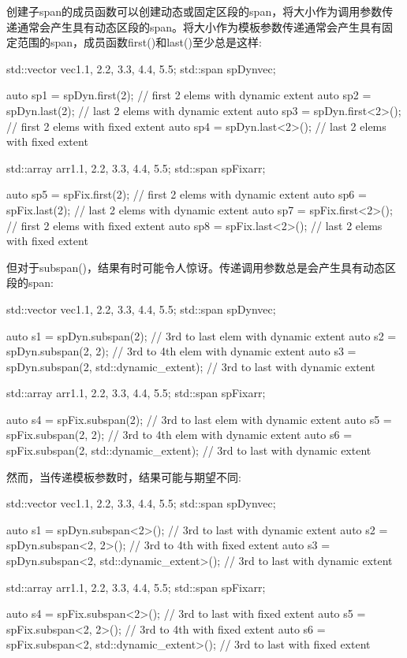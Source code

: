 
创建子span的成员函数可以创建动态或固定区段的span，将大小作为调用参数传递通常会产生具有动态区段的span。将大小作为模板参数传递通常会产生具有固定范围的span，成员函数first()和last()至少总是这样:

\begin{cpp}
std::vector vec{1.1, 2.2, 3.3, 4.4, 5.5};
std::span spDyn{vec};

auto sp1 = spDyn.first(2); // first 2 elems with dynamic extent
auto sp2 = spDyn.last(2); // last 2 elems with dynamic extent
auto sp3 = spDyn.first<2>(); // first 2 elems with fixed extent
auto sp4 = spDyn.last<2>(); // last 2 elems with fixed extent

std::array arr{1.1, 2.2, 3.3, 4.4, 5.5};
std::span spFix{arr};

auto sp5 = spFix.first(2); // first 2 elems with dynamic extent
auto sp6 = spFix.last(2); // last 2 elems with dynamic extent
auto sp7 = spFix.first<2>(); // first 2 elems with fixed extent
auto sp8 = spFix.last<2>(); // last 2 elems with fixed extent
\end{cpp}

但对于subspan()，结果有时可能令人惊讶。传递调用参数总是会产生具有动态区段的span:

\begin{cpp}
std::vector vec{1.1, 2.2, 3.3, 4.4, 5.5};
std::span spDyn{vec};

auto s1 = spDyn.subspan(2); // 3rd to last elem with dynamic extent
auto s2 = spDyn.subspan(2, 2); // 3rd to 4th elem with dynamic extent
auto s3 = spDyn.subspan(2, std::dynamic_extent); // 3rd to last with dynamic extent

std::array arr{1.1, 2.2, 3.3, 4.4, 5.5};
std::span spFix{arr};

auto s4 = spFix.subspan(2); // 3rd to last elem with dynamic extent
auto s5 = spFix.subspan(2, 2); // 3rd to 4th elem with dynamic extent
auto s6 = spFix.subspan(2, std::dynamic_extent); // 3rd to last with dynamic extent
\end{cpp}

然而，当传递模板参数时，结果可能与期望不同:

\begin{cpp}
std::vector vec{1.1, 2.2, 3.3, 4.4, 5.5};
std::span spDyn{vec};

auto s1 = spDyn.subspan<2>(); // 3rd to last with dynamic extent
auto s2 = spDyn.subspan<2, 2>(); // 3rd to 4th with fixed extent
auto s3 = spDyn.subspan<2, std::dynamic_extent>(); // 3rd to last with dynamic extent

std::array arr{1.1, 2.2, 3.3, 4.4, 5.5};
std::span spFix{arr};

auto s4 = spFix.subspan<2>(); // 3rd to last with fixed extent
auto s5 = spFix.subspan<2, 2>(); // 3rd to 4th with fixed extent
auto s6 = spFix.subspan<2, std::dynamic_extent>(); // 3rd to last with fixed extent
\end{cpp}


